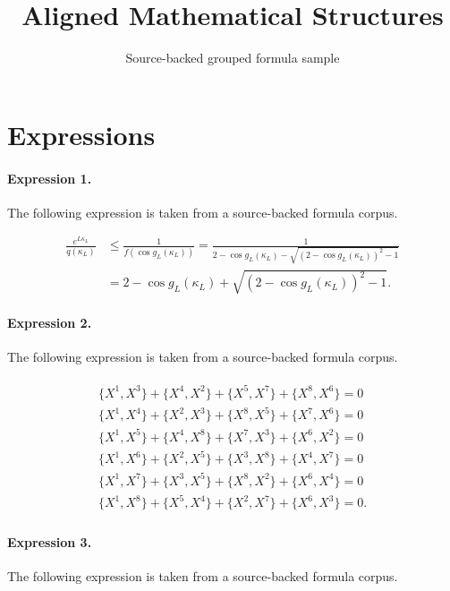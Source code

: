 \documentclass[11pt]{article}
\title{Aligned Mathematical Structures}
\author{Source-backed grouped formula sample}
\date{}
\begin{document}
\maketitle
\section{Expressions}
\paragraph{Expression 1.} The following expression is taken from a source-backed formula corpus.

\begin{align*}\frac{e^{L \kappa_L}}{q\left( \kappa_L \right)} &\leq\frac{1}{f\left( \cos{g_L\left( \kappa_L \right)} \right)} =\frac{1}{2 - \cos{g_L\left( \kappa_L \right)} - \sqrt{\left( 2 - \cos{g_L\left( \kappa_L \right)} \right)^2 - 1}} \\ &=2 - \cos{g_L\left( \kappa_L \right)}+ \sqrt{\left( 2 - \cos{g_L\left( \kappa_L \right)} \right)^2 - 1}.\end{align*}

\paragraph{Expression 2.} The following expression is taken from a source-backed formula corpus.

\begin{align*}\begin{array}{lcr}\{X^1,X^3\}+\{X^4,X^2\}+\{X^5,X^7\}+\{X^8,X^6\}=0\\\{X^1,X^4\}+\{X^2,X^3\}+\{X^8,X^5\}+\{X^7,X^6\}=0\\\{X^1,X^5\}+\{X^4,X^8\}+\{X^7,X^3\}+\{X^6,X^2\}=0\\\{X^1,X^6\}+\{X^2,X^5\}+\{X^3,X^8\}+\{X^4,X^7\}=0\\\{X^1,X^7\}+\{X^3,X^5\}+\{X^8,X^2\}+\{X^6,X^4\}=0\\\{X^1,X^8\}+\{X^5,X^4\}+\{X^2,X^7\}+\{X^6,X^3\}=0 .\end{array}\end{align*}

\paragraph{Expression 3.} The following expression is taken from a source-backed formula corpus.
\end{document}
